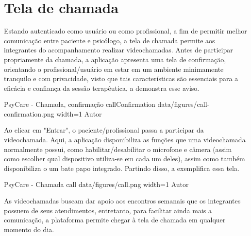 \section{Tela de chamada}
\label{sec:chamada}

Estando autenticado como usuário ou como profissional, a fim de permitir melhor comunicação entre paciente e psicólogo, a tela de chamada permite aos integrantes do acompanhamento realizar videochamadas. Antes de participar propriamente da chamada, a aplicação apresenta uma tela de confirmação, orientando o profissional/usuário em estar em um ambiente minimamente tranquilo e com privacidade, visto que tais características são essenciais para a eficácia e confiança da sessão terapêutica, a  demonstra esse aviso.

\image
    {PsyCare - Chamada, confirmação}
    {callConfirmation}
    {data/figures/call-confirmation.png}
    {width=1\textwidth}
    {Autor}

Ao clicar em "Entrar", o paciente/profissional passa a participar da videochamada. Aqui, a aplicação disponibiliza as funções que uma videochamada normalmente possui, como habilitar/desabilitar o microfone e câmera (assim como escolher qual dispositivo utiliza-se em cada um deles), assim como também disponibiliza o um bate papo integrado. Partindo disso, a  exemplifica essa tela.

\image
    {PsyCare - Chamada}
    {call}
    {data/figures/call.png}
    {width=1\textwidth}
    {Autor}

As videochamadas buscam dar apoio aos encontros semanais que os integrantes possuem de seus atendimentos, entretanto, para facilitar ainda mais a comunicação, a plataforma permite chegar à tela de chamada em qualquer momento do dia. 